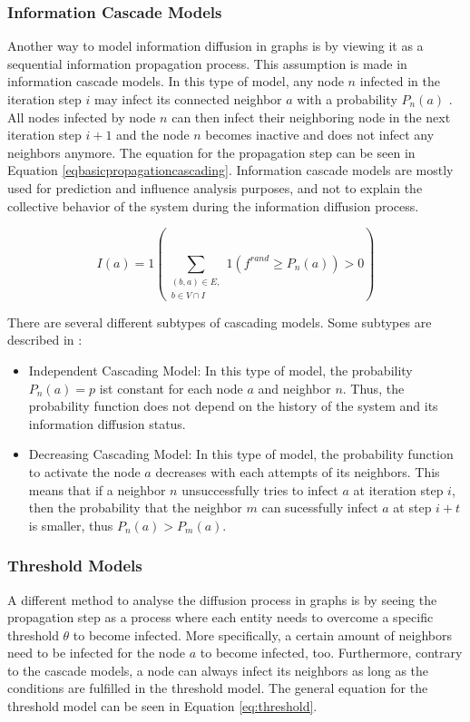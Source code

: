 
\subsubsection{Information Cascade Models}

Another way to model information diffusion in graphs is by viewing it as a 
sequential information propagation process. This assumption is made in
information cascade models. In this type of model, any node $n$ infected in the
iteration step $i$ may infect its connected neighbor $a$ with a probability $P_n(a)$
\cite{reviewinformationdiffusion}. All nodes infected by node $n$
can then infect their neighboring node in the next iteration step $i+1$
and the node $n$ becomes inactive and does not infect any neighbors anymore.
The equation for the propagation step can be seen in Equation 
\ref{eqbasicpropagationcascading}.
Information cascade models are mostly used for prediction and influence 
analysis purposes, and not to explain the collective behavior
of the system during the information diffusion process.

\begin{equation}
    I(a) = 1 (\sum\limits_{\substack{(b,a)\in E, \\ b \in V \cap I}}
    1(f^{rand}\geq P_n(a))>0) 
    \label{eqbasicpropagationcascading}
\end{equation}

There are several different subtypes of cascading models.
Some subtypes are described in \cite{diffusionbasics}:

\begin{itemize}
    \item Independent Cascading Model: In this type of model, the 
    probability $P_n(a)=p$ ist constant for each node $a$ and neighbor $n$.
    Thus, the probability function does not depend on the history 
    of the system and its information diffusion status.
    \item Decreasing Cascading Model: In this type of model, the probability
    function to activate the node $a$ decreases with each attempts of its 
    neighbors. This means that if a neighbor $n$ unsuccessfully tries to infect
    $a$ at iteration step $i$, then the probability that the neighbor $m$
    can sucessfully infect $a$ at step $i+t$ is smaller, thus $P_n(a)>P_m(a)$.
\end{itemize}

\subsubsection{Threshold Models}
A different method to analyse the diffusion process in graphs is by seeing the
propagation step as a process where each entity needs to overcome a 
specific threshold $\theta$ to become infected. More specifically, 
a certain amount of neighbors need to be infected for the node $a$ to become 
infected, too. Furthermore, contrary to the cascade models, a node can always 
infect its neighbors as long as the conditions are fulfilled in the threshold 
model. The general equation for the threshold model can be seen in Equation
\ref{eq:threshold}.

